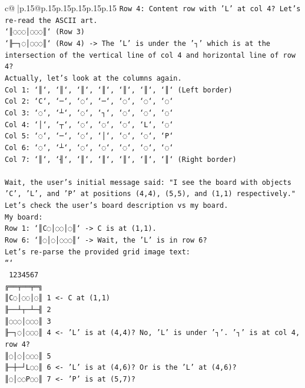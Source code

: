 \documentclass{article}
\begin{document}
{\begin{supertabular}{c@{$\;$}|p{.15\linewidth}@{}p{.15\linewidth}p{.15\linewidth}p{.15\linewidth}p{.15\linewidth}p{.15\linewidth}}
{{{\texttt{Row 4: Content row with 'L' at col 4? Let's re{-}read the ASCII art.} \\
\texttt{`║◌◌◌│◌◌◌║` (Row 3)} \\
\texttt{`╟─┐◌│◌◌◌║` (Row 4) {-}> The 'L' is under the '┐' which is at the intersection of the vertical line of col 4 and horizontal line of row 4?} \\
\texttt{Actually, let's look at the columns again.} \\
\texttt{Col 1: `║`, `║`, `║`, `║`, `║`, `║`, `║` (Left border)} \\
\texttt{Col 2: `C`, `─`, `◌`, `─`, `◌`, `◌`, `◌`} \\
\texttt{Col 3: `◌`, `┴`, `◌`, `┐`, `◌`, `◌`, `◌`} \\
\texttt{Col 4: `│`, `┬`, `◌`, `◌`, `◌`, `L`, `◌`} \\
\texttt{Col 5: `◌`, `─`, `◌`, `│`, `◌`, `◌`, `P`} \\
\texttt{Col 6: `◌`, `┴`, `◌`, `◌`, `◌`, `◌`, `◌`} \\
\texttt{Col 7: `║`, `╢`, `║`, `║`, `║`, `║`, `║` (Right border)} \\
\\ 
\texttt{Wait, the user's initial message said: "I see the board with objects 'C', 'L', and 'P' at positions (4,4), (5,5), and (1,1) respectively."} \\
\texttt{Let's check the user's board description vs my board.} \\
\texttt{My board:} \\
\texttt{Row 1: `║C◌│◌◌│◌║` {-}> C is at (1,1).} \\
\texttt{Row 6: `║◌│◌│◌◌◌║` {-}> Wait, the 'L' is in row 6?} \\
\texttt{Let's re{-}parse the provided grid image text:} \\
\texttt{```} \\
\texttt{ 1234567} \\
\texttt{╔══╤══╤═╗} \\
\texttt{║C◌│◌◌│◌║ 1  <{-} C at (1,1)} \\
\texttt{╟──┴┬─┴─╢ 2} \\
\texttt{║◌◌◌│◌◌◌║ 3} \\
\texttt{╟─┐◌│◌◌◌║ 4  <{-} 'L' is at (4,4)? No, 'L' is under '┐'. '┐' is at col 4, row 4?} \\
\texttt{║◌│◌│◌◌◌║ 5} \\
\texttt{╟─┼─┘L◌◌║ 6  <{-} 'L' is at (4,6)? Or is the 'L' at (4,6)?} \\
\texttt{║◌│◌◌P◌◌║ 7  <{-} 'P' is at (5,7)?} \\
}}}
\end{supertabular}}
\end{document}
